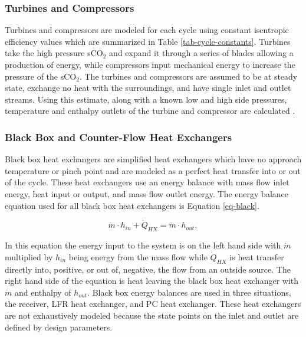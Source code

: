 \subsubsection{Turbines and Compressors }

Turbines and compressors are modeled for each cycle using constant isentropic efficiency values which are summarized in Table \ref{tab-cycle-constants}. Turbines take the high pressure sCO$_2$ and expand it through a series of blades allowing a production of energy, while compressors input mechanical energy to increase the pressure of the sCO$_2$. The turbines and compressors are assumed to be at steady state, exchange no heat with the surroundings, and have single inlet and outlet streams. Using this estimate, along with a known low and high side pressures, temperature and enthalpy outlets of the turbine and compressor are calculated \cite{klein_nellis_2011}. 


\subsubsection{Black Box and Counter-Flow Heat Exchangers}

Black box heat exchangers are simplified heat exchangers which have no approach temperature or pinch point and are modeled as a perfect heat transfer into or out of the cycle. These heat exchangers use an energy balance with mass flow inlet energy, heat input or output, and mass flow outlet energy. The energy balance equation used for all black box heat exchangers is Equation \ref{eq-black}.



\begin{equation}
    \label{eq-black}
    \dot{m} \cdot h_{in} + \dot{Q}_{HX} = \dot{m} \cdot h_{out} ,
\end{equation}

In this equation the energy input to the system is on the left hand side with $\dot{m}$ multiplied by $h_{in}$ being energy from the mass flow while $\dot{Q}_{HX}$ is heat transfer directly into, positive, or out of, negative, the flow from an outside source. The right hand side of the equation is heat leaving the black box heat exchanger with $\dot{m}$ and enthalpy of $h_{out}$. Black box energy balances are used in three situations, the receiver, LFR heat exchanger, and PC heat exchanger. These heat exchangers are not exhaustively modeled because the state points on the inlet and outlet are defined by design parameters.

